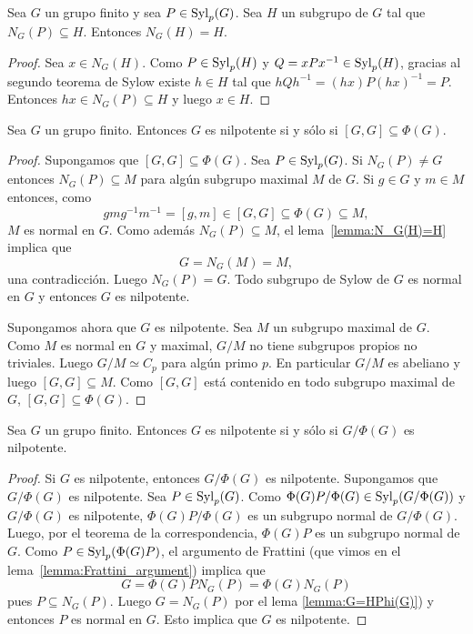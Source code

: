 \begin{lemma}
	\label{lemma:N_G(H)=H}
	Sea $G$ un grupo finito y sea $P\in\mathrm{Syl}_p(G)$. Sea $H$ un subgrupo de $G$
	tal que $N_G(P)\subseteq H$. Entonces $N_G(H)=H$.
\end{lemma}

\begin{proof}
	Sea $x\in N_G(H)$. Como $P\in\mathrm{Syl}_p(H)$ y $Q=xPx^{-1}\in\mathrm{Syl}_p(H)$, gracias al segundo teorema de Sylow 
	existe
	$h\in H$ tal que $hQh^{-1}=(hx)P(hx)^{-1}=P$. Entonces $hx\in
	N_G(P)\subseteq H$ y luego $x\in H$. 
\end{proof}

\begin{theorem}[Wielandt]
	\label{theorem:Wielandt}
	Sea $G$ un grupo finito. Entonces $G$ es nilpotente si y sólo si
	$[G,G]\subseteq\Phi(G)$.
\end{theorem}

\begin{proof}
	Supongamos que $[G,G]\subseteq\Phi(G)$. Sea $P\in\mathrm{Syl}_p(G)$. Si $N_G(P)\ne
	G$ entonces $N_G(P)\subseteq M$ para algún subgrupo maximal $M$ de $G$. Si
	$g\in G$ y $m\in M$ entonces, como 
	\[
		gmg^{-1}m^{-1}=[g,m]\in [G,G]\subseteq\Phi(G)\subseteq M,
	\]
	$M$ es normal en $G$. Como además $N_G(P)\subseteq M$, el
	lema~\ref{lemma:N_G(H)=H} implica que 
	\[
	G=N_G(M)=M,
	\]
	una contradicción.
	Luego $N_G(P)=G$. Todo subgrupo de Sylow de $G$ es normal en $G$ y entonces
	$G$ es nilpotente.

	Supongamos ahora que $G$ es nilpotente. Sea $M$ un subgrupo maximal de $G$.
	Como $M$ es normal en $G$ y maximal, $G/M$ no tiene subgrupos propios no triviales.
	Luego $G/M\simeq C_p$ para algún primo $p$. En particular $G/M$ es abeliano
	y luego $[G,G]\subseteq M$. Como $[G,G]$ está contenido en
	todo subgrupo maximal de $G$, $[G,G]\subseteq\Phi(G)$.
\end{proof}

\begin{theorem}
	\label{theorem:G/phi(G)}
	Sea $G$ un grupo finito. Entonces $G$ es nilpotente si y sólo si
	$G/\Phi(G)$ es nilpotente.
\end{theorem}

\begin{proof}
	Si $G$ es nilpotente, entonces $G/\Phi(G)$ es nilpotente. Supongamos que $G/\Phi(G)$ es
	nilpotente. Sea $P\in\mathrm{Syl}_p(G)$. Como
	$\Phi(G)P/\Phi(G)\in\mathrm{Syl}_p(G/\Phi(G))$ y $G/\Phi(G)$ es nilpotente,
	$\Phi(G)P/\Phi(G)$ es un subgrupo normal de $G/\Phi(G)$. Luego, por el
	teorema de la correspondencia, $\Phi(G)P$ es un subgrupo normal de $G$.
	Como $P\in\mathrm{Syl}_p(\Phi(G)P)$, el argumento de Frattini 
	(que vimos en el lema~\ref{lemma:Frattini_argument}) implica que
	\[
		G=\Phi(G)PN_G(P)=\Phi(G)N_G(P)
	\]
	pues $P\subseteq N_G(P)$. Luego $G=N_G(P)$ por el
	lema \ref{lemma:G=HPhi(G)}) 
	y entonces $P$ es normal en $G$. Esto
	implica que $G$ es nilpotente.
\end{proof}

